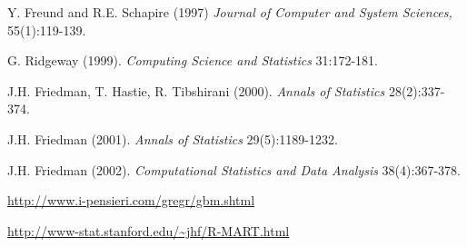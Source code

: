 \begin{References}\relax
Y. Freund and R.E. Schapire (1997)  \emph{Journal of Computer and
System Sciences,} 55(1):119-139.

G. Ridgeway (1999).  \emph{Computing Science and
Statistics} 31:172-181.

J.H. Friedman, T. Hastie, R. Tibshirani (2000).  \emph{Annals of Statistics} 28(2):337-374.

J.H. Friedman (2001).  \emph{Annals of Statistics} 29(5):1189-1232.

J.H. Friedman (2002).  \emph{Computational Statistics
and Data Analysis} 38(4):367-378.

\url{http://www.i-pensieri.com/gregr/gbm.shtml}

\url{http://www-stat.stanford.edu/~jhf/R-MART.html}
\end{References}

